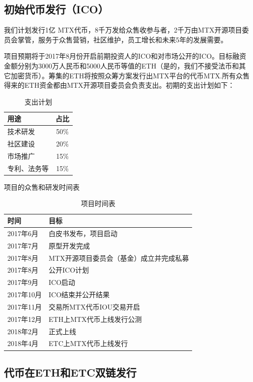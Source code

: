 \documentclass[UTF8,nofonts]{ctexart}
\begin{document}
\newpage
\begin{appendices}
\section{初始代币发行（ICO）\label{sec:ico}}

我们计划发行1亿 MTX代币，8千万发给众售收参与者，2千万由MTX开源项目委员会掌管，服务于众售营销，社区维护，员工增长和未来5年的发展需要。

项目预期将于2017年8月份开启前期投资人的ICO和对市场公开的ICO。目标融资金额分别为3000万人民币和5000人民币等值的ETH（是的，我们不接受法币和其它加密货币）。筹集的ETH将按照众筹方案发行出MTX平台的代币MTX.所有众售得来的ETH资金都由MTX开源项目委员会负责支出。初期的支出计划如下：

\begin{table}[hbt]
  \centering
  \begin{tabular}{l|c}
 用途   & 占比\\
    \hline
  技术研发 & 50\% \\
  社区建设 & 20\% \\
  市场推广 & 15\% \\
  专利、法务等 & 15\% \\
  \end{tabular}
  \caption{支出计划}
\end{table}


项目的众售和研发时间表
\begin{table}[hbt]
  \centering
  \begin{tabular}{l|l}
 时间   & 目标\\
    \hline
  2017年6月 & 白皮书发布，项目启动 \\
  2017年7月 & 原型开发完成 \\
  2017年8月 & MTX开源项目委员会（基金）成立并完成私募 \\
  2017年8月 & 公开ICO计划 \\
  2017年9月 & ICO启动 \\
  2017年10月 & ICO结束并公开结果 \\
  2017年11月 & 交易所MTX代币IOU交易开启 \\
  2017年12月 & ETH上MTX代币上线发行公测 \\
  2018年2月 & 正式上线 \\
  2018年4月 & ETC上MTX代币上线发行 \\
  \end{tabular}
  \caption{项目时间表}
\end{table}

\subsection{代币在ETH和ETC双链发行\label{sec:chains}}


\end{appendices}
\end{document}
